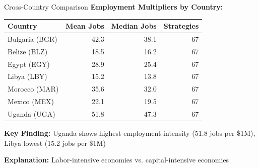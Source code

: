 \documentclass[10pt]{beamer}
\begin{document}
\begin{frame}{Cross-Country Comparison}
\textbf{Employment Multipliers by Country:}

\vspace{0.3cm}

\begin{table}[]
\centering
\small
\begin{tabular}{@{}lrrr@{}}
\toprule
\textbf{Country} & \textbf{Mean Jobs} & \textbf{Median Jobs} & \textbf{Strategies} \\ \midrule
Bulgaria (BGR) & 42.3 & 38.1 & 67 \\
Belize (BLZ) & 18.5 & 16.2 & 67 \\
Egypt (EGY) & 28.9 & 25.4 & 67 \\
Libya (LBY) & 15.2 & 13.8 & 67 \\
Morocco (MAR) & 35.6 & 32.0 & 67 \\
Mexico (MEX) & 22.1 & 19.5 & 67 \\
Uganda (UGA) & 51.8 & 47.3 & 67 \\ \bottomrule
\end{tabular}
\end{table}

\vspace{0.3cm}

\textbf{Key Finding:} Uganda shows highest employment intensity (51.8 jobs per \$1M), Libya lowest (15.2 jobs per \$1M)

\vspace{0.3cm}

\textbf{Explanation:} Labor-intensive economies vs. capital-intensive economies
\end{frame}
\end{document}
